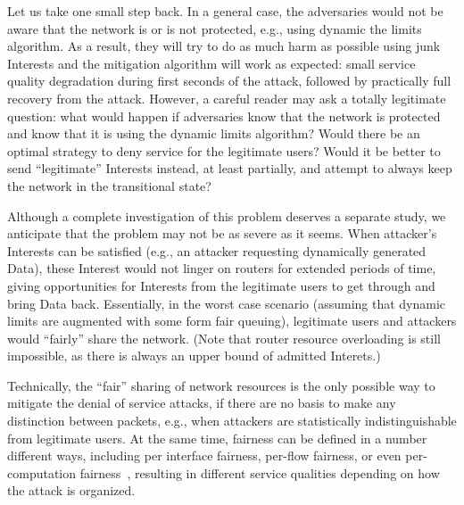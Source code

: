 Let us take one small step back.
In a general case, the adversaries would not be aware that the network is or is not protected, e.g., using dynamic the limits algorithm.
As a result, they will try to do as much harm as possible using junk Interests and the mitigation algorithm will work as expected: small service quality degradation during first seconds of the attack, followed by practically full recovery from the attack.
However, a careful reader may ask a totally legitimate question: what would happen if adversaries know that the network is protected and know that it is using the dynamic limits algorithm?
Would there be an optimal strategy to deny service for the legitimate users?
Would it be better to send ``legitimate'' Interests instead, at least partially, and attempt to always keep the network in the transitional state?


Although a complete investigation of this problem deserves a separate study, we anticipate that the problem may not be as severe as it seems.
When attacker's Interests can be satisfied (e.g., an attacker requesting dynamically generated Data), these Interest would not linger on routers for extended periods of time, giving opportunities for Interests from the legitimate users to get through and bring Data back.
Essentially, in the worst case scenario (assuming that dynamic limits are augmented with some form fair queuing), legitimate users and attackers would ``fairly'' share the network.
(Note that router resource overloading is still impossible, as there is always an upper bound of admitted Interets.)

Technically, the ``fair'' sharing of network resources is the only possible way to mitigate the denial of service attacks, if there are no basis to make any distinction between packets, e.g., when attackers are statistically indistinguishable from legitimate users.
At the same time, fairness can be defined in a number different ways, including per interface fairness, per-flow fairness, or even per-computation fairness~\cite{Capabilities, Portcullis}, resulting in different service qualities depending on how the attack is organized.



